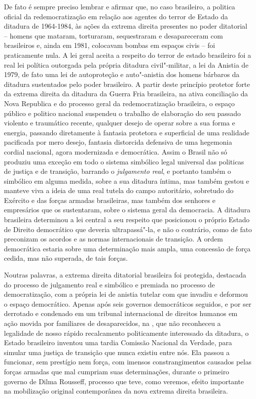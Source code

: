 De fato é sempre preciso lembrar e afirmar que, no caso brasileiro, a
politica oficial da redemocratização em relação aos agentes do terror de
Estado da ditadura de 1964-1984, às ações da extrema direita presentes
no poder ditatorial -- homens que mataram, torturaram, sequestraram e
desapareceram com brasileiros e, ainda em 1981, colocavam bombas em
espaços civis -- foi praticamente nula. A lei geral aceita a respeito do
terror de estado brasileiro foi a real lei política outorgada pela
própria ditadura civil"-militar, a lei da Anistia de 1979, de fato uma
lei de autoproteção e auto"-anistia dos homens bárbaros da ditadura
sustentados pelo poder brasileiro. A partir deste princípio protetor
forte da extrema direita da ditadura da Guerra Fria brasileira, na ativa
conciliação da Nova Republica e do processo geral da redemocratização
brasileira, o espaço público e politico nacional suspendeu o trabalho de
elaboração do seu passado violento e traumático recente, qualquer desejo
de operar sobre a sua forma e energia, passando diretamente à fantasia
protetora e superficial de uma realidade pacificada por mero desejo,
fantasia distorcida defensiva de uma hegemonia cordial nacional, agora
modernizada e democrática. Assim o Brasil não só produziu uma exceção em
todo o sistema simbólico legal universal das politicas de justiça e de
transição, barrando o \emph{julgamento real}, e portanto também o
simbólico em alguma medida, sobre a sua ditadura íntima, mas também
gestou e manteve viva a ideia de uma real tutela do campo autoritário,
sobretudo do Exército e das forças armadas brasileiras, mas também dos
senhores e empresários que os sustentaram, sobre o sistema geral da
democracia. A ditadura brasileira determinou a lei central a seu
respeito que posicionou o próprio Estado de Direito democrático que
deveria ultrapassá"-la, e não o contrário, como de fato preconizam os
acordos e as normas internacionais de transição. A ordem democrática
estaria sobre uma determinação mais ampla, uma concessão de força
cedida, mas não superada, de tais forças.

Noutras palavras, a extrema direita ditatorial brasileira foi protegida,
destacada do processo de julgamento real e simbólico e premiada no
processo de democratização, com a própria lei de anistia tutelar com que
invadiu e deformou o espaço democrático. Apenas após seis governos
democráticos seguidos, e por ser derrotado e condenado em um tribunal
internacional de direitos humanos em ação movida por familiares de
desaparecidos, na , que não reconheceu a legalidade de nosso rápido
recalcamento politicamente interessado da ditadura, o Estado brasileiro
inventou uma tardia Comissão Nacional da Verdade, para simular uma
justiça de transição que nunca existiu entre nós. Ela passou a
funcionar, sem prestígio nem força, com imensos constrangimentos
causados pelas forças armadas que mal cumpriam suas determinações,
durante o primeiro governo de Dilma Rousseff, processo que teve, como
veremos, efeito importante na mobilização original contemporânea da nova
extrema direita brasileira.

